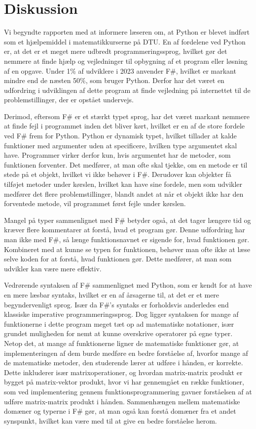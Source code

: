 \documentclass{article}
\begin{document}
\section{Diskussion}
Vi begyndte rapporten med at informere læseren om, at Python er blevet indført som et hjælpemiddel i matematikkurserne på DTU. En af fordelene ved Python er, at det er et meget mere udbredt programmeringssprog, hvilket gør det nemmere at finde hjælp og vejledninger til opbygning af et program eller løsning af en opgave. Under 1\% af udviklere i 2023 anvender F\#, hvilket er markant mindre end de næsten 50\%, som bruger Python. Derfor har det været en udfordring i udviklingen af dette program at finde vejledning på internettet til de problemstillinger, der er opstået undervejs.

Derimod, eftersom F\# er et stærkt typet sprog, har det været markant nemmere at finde fejl i programmet inden det bliver kørt, hvilket er en af de store fordele ved F\# frem for Python. Python er dynamisk typet, hvilket tillader at kalde funktioner med argumenter uden at specificere, hvilken type argumentet skal have. Programmer virker derfor kun, hvis argumentet har de metoder, som funktionen forventer. Det medfører, at man ofte skal tjekke, om en metode er til stede på et objekt, hvilket vi ikke behøver i F\#. Derudover kan objekter få tilføjet metoder under kørslen, hvilket kan have sine fordele, men som udvikler medfører det flere problemstillinger, blandt andet at når et objekt ikke har den forventede metode, vil programmet først fejle under kørslen.

Mangel på typer sammenlignet med F\# betyder også, at det tager længere tid og kræver flere kommentarer at forstå, hvad et program gør. Denne udfordring har man ikke med F\#, så længe funktionsnavnet er sigende for, hvad funktionen gør. Kombineret med at kunne se typen for funktionen, behøver man ofte ikke at læse selve koden for at forstå, hvad funktionen gør. Dette medfører, at man som udvikler kan være mere effektiv.

Vedrørende syntaksen af F\# sammenlignet med Python, som er kendt for at have en mere læsbar syntaks, hvilket er en af årsagerne til, at det er et mere begyndervenligt sprog. Især da F\#'s syntaks er forholdsvis anderledes end klassiske imperative programmeringssprog. Dog ligger syntaksen for mange af funktionerne i dette program meget tæt op ad matematiske notationer, især grundet muligheden for nemt at kunne overskrive operatorer på egne typer. Netop det, at mange af funktionerne ligner de matematiske funktioner gør, at implementeringen af dem burde medføre en bedre forståelse af, hvorfor mange af de matematiske metoder, den studerende lærer at udføre i hånden, er korrekte. Dette inkluderer især matrixoperationer, og hvordan matrix-matrix produkt er bygget på matrix-vektor produkt, hvor vi har gennemgået en række funktioner, som ved implementering gennem funktionsprogrammering gavner forståelsen af at udføre matrix-matrix produkt i hånden. Sammenhængen mellem matematiske domæner og typerne i F\# gør, at man også kan forstå domæner fra et andet synspunkt, hvilket kan være med til at give en bedre forståelse herom.
\end{document}
